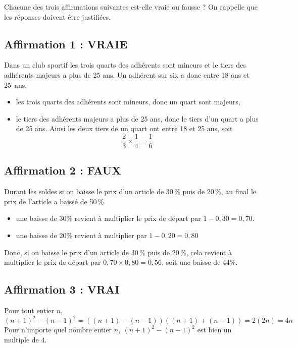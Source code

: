  
Chacune des trois affirmations suivantes est-elle vraie ou fausse ? On rappelle que les réponses doivent être justifiées.
 
\subsection*{Affirmation 1 : VRAIE}
 
Dans un club sportif les trois quarts des adhérents sont mineurs et le tiers des adhérents majeurs a plus de 25 ans. Un adhérent sur six a donc entre 18 ans et 25~ans.

\begin{itemize}
\item les trois quarts des adhérents sont mineurs, donc un quart sont majeurs,
\item le tiers des adhérents majeurs a plus de 25 ans, donc le tiers d'un quart a plus de 25 ans. Ainsi les deux tiers de un quart ont entre 18 et 25 ans, soit
\[
\frac{2}{3}\times\frac{1}{4}=\frac{1}{6}
\]
\end{itemize}

\subsection*{Affirmation 2 : FAUX}
 
Durant les soldes si on baisse le prix d'un article de 30\,\% puis de 20\,\%, au final le prix de l'article a baissé de 50\,\%.

\begin{itemize}
\item une baisse de 30\%{} revient à multiplier le prix de départ par $1-0,30=0,70$.
\item une baisse de 20\%{} revient à multiplier par $1-0,20=0,80$
\end{itemize}
Donc, si on baisse le prix d'un article de 30\,\% puis de 20\,\%, cela revient à multiplier le prix de départ par $0,70\times 0,80=0,56$, soit une baisse de 44\%.

\subsection*{Affirmation 3 : VRAI}
Pour tout entier $n$,
 \[
 (n + 1)^2 - (n - 1)^2=\left((n+1)-(n-1)\right)\left((n+1)+(n-1)\right)=2(2n)=4n
 \]
Pour n'importe quel nombre entier $n,\: (n + 1)^2 - (n - 1)^2$ est bien un multiple de $4$. 



